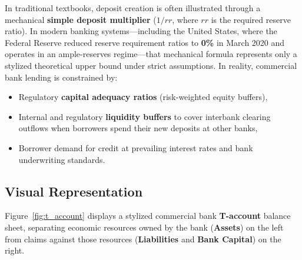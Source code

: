 \documentclass[11pt, oneside]{book}
\begin{document}
In traditional textbooks, deposit creation is often illustrated through a mechanical \textbf{simple deposit multiplier} ($1 / rr$, where $rr$ is the required reserve ratio). In modern banking systems—including the United States, where the Federal Reserve reduced reserve requirement ratios to \textbf{0\%} in March 2020 and operates in an ample-reserves regime—that mechanical formula represents only a stylized theoretical upper bound under strict assumptions. In reality, commercial bank lending is constrained by:
\begin{itemize}[leftmargin=1.5em, itemsep=2pt]
  \item Regulatory \textbf{capital adequacy ratios} (risk-weighted equity buffers),
  \item Internal and regulatory \textbf{liquidity buffers} to cover interbank clearing outflows when borrowers spend their new deposits at other banks,
  \item Borrower demand for credit at prevailing interest rates and bank underwriting standards.
\end{itemize}

\subsection*{Visual Representation}

Figure~\ref{fig:t_account} displays a stylized commercial bank \textbf{T-account} balance sheet, separating economic resources owned by the bank (\textbf{Assets}) on the left from claims against those resources (\textbf{Liabilities} and \textbf{Bank Capital}) on the right.
\end{document}
